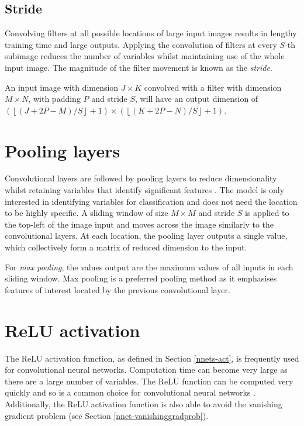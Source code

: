 \subsection*{Stride}\label{convnets-stride}

Convolving filters at all possible locations of large input images results in lengthy training time and large outputs. Applying the convolution of filters at every $S$-th subimage reduces the number of variables whilst maintaining use of the whole input image. The magnitude of the filter movement is known as the \textit{stride}.

An input image with dimension $J \times K$ convolved with a filter with dimension $M \times N$, with padding $P$ and stride $S$, will have an output dimension of $\left(\left\lfloor (J + 2P - M)/S\right\rfloor + 1\right) \times \left(\left\lfloor (K + 2P - N)/S \right\rfloor + 1\right)$.

\section{Pooling layers}\label{convnets-pool}

Convolutional layers are followed by pooling layers to reduce dimensionality whilst retaining variables that identify significant features \cite{ADeshpande2016}. The model is only interested in identifying variables for classification and does not need the location to be highly specific. A sliding window of size $M\times M$ and stride $S$ is applied to the top-left of the image input and moves across the image similarly to the convolutional layers. At each location, the pooling layer outputs a single value, which collectively form a matrix of reduced dimension to the input.

For \textit{max pooling}, the values output are the maximum values of all inputs in each sliding window. Max pooling is a preferred pooling method as it emphasises features of interest located by the previous convolutional layer.

\section{ReLU activation}\label{convnets-act}

The ReLU activation function, as defined in Section \ref{nnets-act}, is frequently used for  convolutional neural networks. Computation time can become very large as there are a large number of variables. The ReLU function can be computed very quickly and so is a common choice for convolutional neural networks \cite{ADeshpande2016}. Additionally, the ReLU activation function is also able to avoid the vanishing gradient problem (see Section \ref{nnet-vanishinggradprob}).


